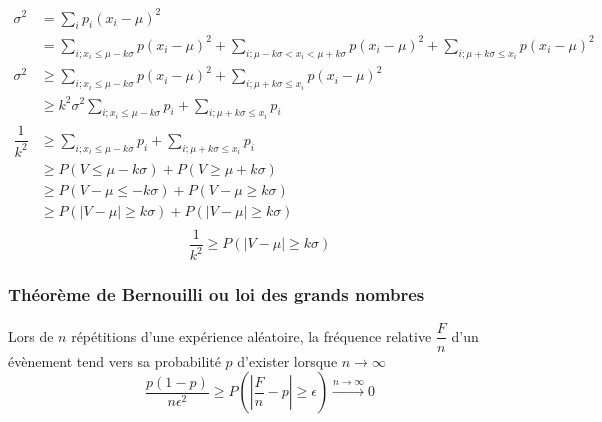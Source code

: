\begin{align*}
	\sigma^2 &= \sum_{i} p_i(x_i - \mu)^2\\
	         &= \sum_{i;x_i\leq\mu-k\sigma} p(x_i - \mu)^2 + \sum_{i;\mu-k\sigma < x_i < \mu+k\sigma} p(x_i - \mu)^2 + \sum_{i;\mu+k\sigma\leq x_i} p(x_i - \mu)^2\\
	\sigma^2 &\geq\sum_{i;x_i\leq\mu-k\sigma} p(x_i - \mu)^2 + \sum_{i;\mu+k\sigma\leq x_i} p(x_i - \mu)^2\\
	         &\geq k^2\sigma^2 \sum_{i;x_i\leq\mu-k\sigma} p_i + \sum_{i;\mu+k\sigma\leq x_i} p_i\\
	\dfrac{1}{k^2} &\geq \sum_{i;x_i\leq\mu-k\sigma} p_i + \sum_{i;\mu+k\sigma\leq x_i} p_i\\
	         &\geq P(V \leq \mu - k\sigma) + P(V \geq \mu +k\sigma)\\
	         &\geq P(V - \mu \leq - k\sigma) + P(V - \mu \geq k\sigma)\\
	         &\geq P(|V - \mu| \geq k\sigma) + P(|V - \mu| \geq k\sigma)\\
\end{align*}
$$\boxed{\dfrac{1}{k^2} \geq P(|V - \mu| \geq k\sigma)}$$




\newpage
\subsubsection{Théorème de Bernouilli ou loi des grands nombres}
Lors de $n$ répétitions d'une expérience aléatoire, la fréquence relative $\dfrac{F}{n}$ d'un évènement tend vers sa probabilité $p$ d'exister lorsque $n\rightarrow\infty$
$$\boxed{\dfrac{p(1-p)}{n\epsilon^2} \geq P\left(\left|\dfrac{F}{n}-p\right|\geq\epsilon\right) \stackrel{n\rightarrow\infty}{\rightarrow} 0}$$
